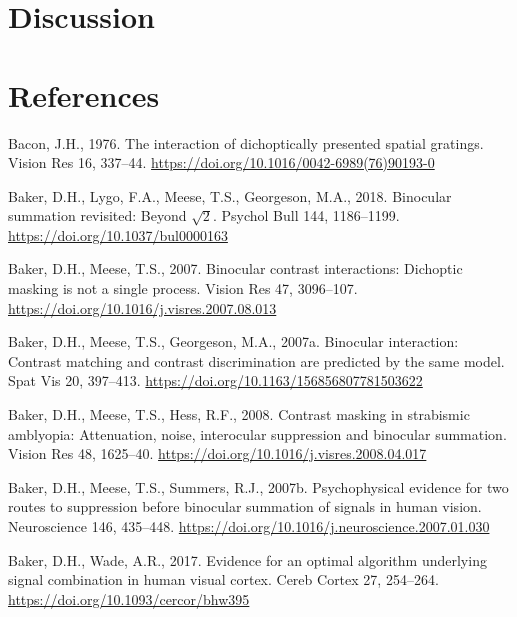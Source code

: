 \documentclass[
  12pt,
]{article}
\newlength{\cslhangindent}
\newenvironment{CSLReferences}[2] %
 {\begin{list}{}{%
  \setlength{\itemindent}{0pt}
  \setlength{\leftmargin}{0pt}
  \setlength{\parsep}{0pt}
  \ifodd #1
   \setlength{\leftmargin}{\cslhangindent}
   \setlength{\itemindent}{-1\cslhangindent}
  \fi
  \setlength{\itemsep}{#2\baselineskip}}}
 {\end{list}}
\begin{document}
\section{Discussion}\label{discussion}

\section*{References}\label{references}

\label{refs}
\begin{CSLReferences}{1}{0}
Bacon, J.H., 1976. The interaction of dichoptically presented spatial
gratings. Vision Res 16, 337--44.
\url{https://doi.org/10.1016/0042-6989(76)90193-0}

Baker, D.H., Lygo, F.A., Meese, T.S., Georgeson, M.A., 2018. Binocular
summation revisited: Beyond \(\sqrt{2}\). Psychol Bull 144, 1186--1199.
\url{https://doi.org/10.1037/bul0000163}

Baker, D.H., Meese, T.S., 2007. Binocular contrast interactions:
Dichoptic masking is not a single process. Vision Res 47, 3096--107.
\url{https://doi.org/10.1016/j.visres.2007.08.013}

Baker, D.H., Meese, T.S., Georgeson, M.A., 2007a. Binocular interaction:
Contrast matching and contrast discrimination are predicted by the same
model. Spat Vis 20, 397--413.
\url{https://doi.org/10.1163/156856807781503622}

Baker, D.H., Meese, T.S., Hess, R.F., 2008. Contrast masking in
strabismic amblyopia: Attenuation, noise, interocular suppression and
binocular summation. Vision Res 48, 1625--40.
\url{https://doi.org/10.1016/j.visres.2008.04.017}

Baker, D.H., Meese, T.S., Summers, R.J., 2007b. Psychophysical evidence
for two routes to suppression before binocular summation of signals in
human vision. Neuroscience 146, 435--448.
\url{https://doi.org/10.1016/j.neuroscience.2007.01.030}

Baker, D.H., Wade, A.R., 2017. Evidence for an optimal algorithm
underlying signal combination in human visual cortex. Cereb Cortex 27,
254--264. \url{https://doi.org/10.1093/cercor/bhw395}


\end{CSLReferences}
\end{document}
